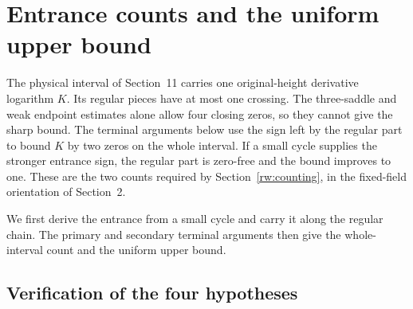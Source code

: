 \section{Entrance counts and the uniform upper bound}
\label{rw:upper-section}

The physical interval of Section~11 carries one original-height
derivative logarithm $K$. Its regular pieces have at most one crossing.
The three-saddle and weak endpoint estimates alone allow four closing
zeros, so they cannot give the sharp bound. The terminal arguments
below use the sign left by the regular part to bound $K$ by two zeros
on the whole interval. If a small cycle supplies the stronger entrance
sign, the regular part is zero-free and the bound improves to one.
These are the two counts required by Section~\ref{rw:counting}, in the
fixed-field orientation of Section~2.

We first derive the entrance from a small cycle and carry it along
the regular chain. The primary and secondary terminal arguments then
give the whole-interval count and the uniform upper bound.







\subsection{Verification of the four hypotheses}

